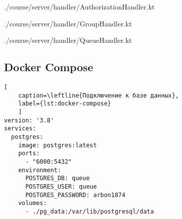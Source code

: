 
{./course/server/handler/AuthorizationHandler.kt}

{./course/server/handler/GroupHandler.kt}

{./course/server/handler/QueueHandler.kt}

\subsection{Docker Compose}
\begin{lstlisting}[
	caption=\leftline{Подключение к базе данных},
	label={lst:docker-compose}
	]
version: '3.8'
services:
  postgres:
    image: postgres:latest
    ports:
      - "6000:5432"
    environment:
      POSTGRES_DB: queue
      POSTGRES_USER: queue
      POSTGRES_PASSWORD: arbon1874
    volumes:
      - ./pg_data:/var/lib/postgresql/data
\end{lstlisting}

